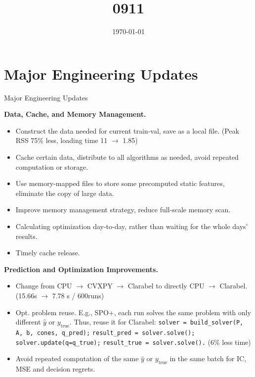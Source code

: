 \documentclass[aspectratio=169,xcolor=dvipsnames]{beamer}
\title{0911}
\date{\today} %
\begin{document}
\begin{frame}
    \titlepage
\end{frame}


\section{Major Engineering Updates}

\begin{frame}
    \tableofcontents[currentsection]
\end{frame}

\begin{frame}[allowframebreaks]{Major Engineering Updates}

\textbf{Data, Cache, and Memory Management.}
\begin{itemize}
    \item Construct the data needed for current train-val, save as a local file. (Peak RSS 75\% less, loading time 11 $\to$ 1.85)
    \item Cache certain data, distribute to all algorithms as needed, avoid repeated computation or storage.
    \item Use memory-mapped files to store some precomputed static features, eliminate the copy of large data.
    \item Improve memory management strategy, reduce full-scale memory scan.
    \item Calculating optimization day-to-day, rather than waiting for the whole days' results.
    \item Timely cache release.
\end{itemize}

\break

\textbf{Prediction and Optimization Improvements.}
\begin{itemize}
    \item Change from CPU $\to$ CVXPY $\to$ Clarabel to directly CPU $\to$ Clarabel. (15.66s $\to$ 7.78 s / 600runs)
    \item Opt. problem reuse. E.g., SPO+, each run solves the same problem with only different $\hat{y}$ or $y_{\text{true}}$. Thus, reuse it for Clarabel: \texttt{solver = build\_solver(P, A, b, cones, q\_pred);} \texttt{result\_pred = solver.solve();} \texttt{solver.update(q=q\_true);} \texttt{result\_true = solver.solve().} (6\% less time)
    \item Avoid repeated computation of the same $\hat{y}$ or $y_{\text{true}}$ in the same batch for IC, MSE and decision regrets.
\end{itemize}
    

\end{frame}
\end{document}
